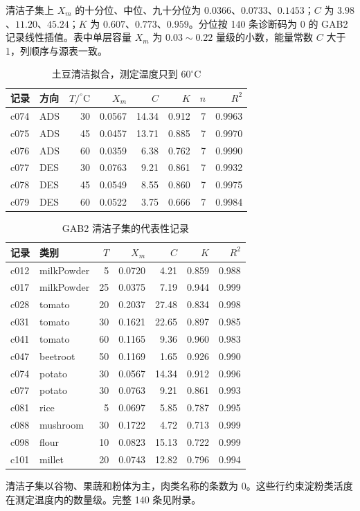 清洁子集上 \(X_m\) 的十分位、中位、九十分位为 \(0.0366\)、\(0.0733\)、\(0.1453\)；\(C\) 为 \(3.98\)、\(11.20\)、\(45.24\)；\(K\) 为 \(0.607\)、\(0.773\)、\(0.959\)。分位按 140 条诊断码为 0 的 GAB2 记录线性插值。表中单层容量 \(X_m\) 为 \(0.03\sim 0.22\) 量级的小数，能量常数 \(C\) 大于 1，列顺序与源表一致。

\begin{table}[htbp]
\centering
\caption{土豆清洁拟合，测定温度只到 \(60^\circ\mathrm{C}\)}
\label{tab:potato}
\setlength{\tabcolsep}{3.2pt}
{\small
\begin{tabular}{llrrrrrr}
\toprule
记录 & 方向 & \(T/^\circ\mathrm{C}\) & \(X_m\) & \(C\) & \(K\) & \(n\) & \(R^2\) \\
\midrule
c074 & ADS & 30 & 0.0567 & 14.34 & 0.912 & 7 & 0.9963 \\
c075 & ADS & 45 & 0.0457 & 13.71 & 0.885 & 7 & 0.9970 \\
c076 & ADS & 60 & 0.0359 & 6.38 & 0.762 & 7 & 0.9990 \\
c077 & DES & 30 & 0.0763 & 9.21 & 0.861 & 7 & 0.9932 \\
c078 & DES & 45 & 0.0549 & 8.55 & 0.860 & 7 & 0.9975 \\
c079 & DES & 60 & 0.0522 & 3.75 & 0.666 & 7 & 0.9984 \\
\bottomrule
\end{tabular}}
\end{table}

\begin{table}[htbp]
\centering
\caption{GAB2 清洁子集的代表性记录}
\label{tab:gab12}
\setlength{\tabcolsep}{3.0pt}
{\small
\begin{tabular}{llrrrrr}
\toprule
记录 & 类别 & \(T\) & \(X_m\) & \(C\) & \(K\) & \(R^2\) \\
\midrule
c012 & milkPowder & 5 & 0.0720 & 4.21 & 0.859 & 0.988 \\
c017 & milkPowder & 25 & 0.0375 & 7.19 & 0.944 & 0.999 \\
c028 & tomato & 20 & 0.2037 & 27.48 & 0.834 & 0.998 \\
c031 & tomato & 30 & 0.1621 & 22.65 & 0.897 & 0.985 \\
c041 & tomato & 60 & 0.1165 & 9.36 & 0.960 & 0.983 \\
c047 & beetroot & 50 & 0.1169 & 1.65 & 0.926 & 0.990 \\
c074 & potato & 30 & 0.0567 & 14.34 & 0.912 & 0.996 \\
c077 & potato & 30 & 0.0763 & 9.21 & 0.861 & 0.993 \\
c081 & rice & 5 & 0.0697 & 5.85 & 0.787 & 0.995 \\
c088 & mushroom & 30 & 0.1722 & 4.72 & 0.713 & 0.999 \\
c098 & flour & 10 & 0.0823 & 15.13 & 0.722 & 0.999 \\
c101 & millet & 20 & 0.0743 & 12.82 & 0.796 & 0.994 \\
\bottomrule
\end{tabular}}
\end{table}

清洁子集以谷物、果蔬和粉体为主，肉类名称的条数为 0。这些行约束淀粉类活度在测定温度内的数量级。完整 140 条见附录。
